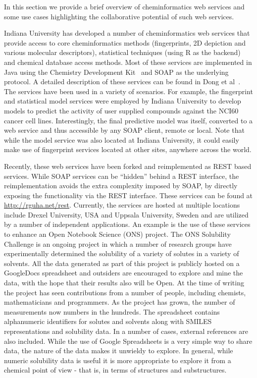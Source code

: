 \documentclass[11pt]{book}
\begin{document}
In this section we provide a brief overview of cheminformatics web
services and some use cases highlighting the collaborative potential
of such web services.

Indiana University has developed a number of cheminformatics web
services\cite{Dong2007Web} that provide access to core cheminformatics methods
(fingerprints, 2D depiction and various molecular descriptors),
statistical techniques (using R\cite{r} as the backend) and chemical
database access methods. Most of these services are implemented in
Java using the Chemistry Development Kit~\cite{Steinbeck2003} and SOAP as the
underlying protocol. A detailed description of these services can be
found in Dong et al~\cite{Dong2007Web}. The services have been used in
a variety of scenarios. For example, the fingerprint and statistical
model services were employed by Indiana University to develop
models to predict the activity of user supplied compounds against the
NCI60 cancer cell lines. Interestingly, the final predictive model was
itself, converted to a web service and thus accessible by any SOAP client,
remote or local. Note that while the model service was also located at
Indiana University, it could easily make use of fingerprint services
located at other sites, anywhere across the world.

Recently, these web services have been forked and reimplemented as
REST based services. While SOAP services can be ``hidden'' behind a
REST interface, the reimplementation avoids the extra complexity
imposed by SOAP, by directly exposing the functionality via the REST
interface. These services can be found at
\url{http://rguha.net/rest}. Currently, the
services are hosted at multiple locations include Drexel University,
USA and Uppsala University, Sweden and are utilized by a number of
independent applications. An example is the use of these services to
enhance an Open Notebook Science (ONS) project. The ONS Solubility
Challenge is an ongoing project in which a number of research groups
have experimentally determined the solubility of a variety of solutes
in a variety of solvents. All the data generated as part of this
project is publicly hosted on a GoogleDocs spreadsheet and outsiders
are encouraged to explore and mine the data, with the hope that their
results also will be Open. At the time of writing the project
has seen contributions from a number of people, including chemists,
mathematicians and programmers. As the project has grown, the number
of measurements now numbers in the hundreds. The spreadsheet contains
alphanumeric identifiers for solutes and solvents along with SMILES
representations and solubility data. In a number of cases, external
references are also included. While the use of Google Spreadsheets is
a very simple way to share data, the nature of the data makes it
unwieldy to explore. In general, while numeric solubility data is
useful it is more appropriate to explore it from a chemical point of
view - that is, in terms of structures and substructures.
\end{document}
